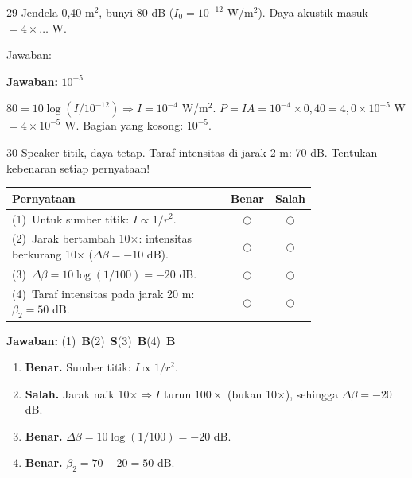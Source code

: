 \documentclass[11pt]{article}
\newcommand{\jawaban}[1]{%
  \noindent\colorbox{gold!30}{\parbox{\dimexpr\linewidth-2\fboxsep\relax}{%
    \textbf{Jawaban:} #1}}\par\smallskip}
\begin{document}
\begin{soal}{29}
Jendela 0{,}40 m$^2$, bunyi 80 dB ($I_0=10^{-12}$ W/m$^2$).
Daya akustik masuk $=4\times\ldots$ W.

\vspace{0.4em}\noindent Jawaban:\enspace\underline{\hspace{4cm}}
\end{soal}
\begin{pembox}
\jawaban{$10^{-5}$}
$80=10\log(I/10^{-12})\Rightarrow I=10^{-4}$ W/m$^2$.
$P=IA=10^{-4}\times0{,}40=4{,}0\times10^{-5}$ W $=4\times10^{-5}$ W.
Bagian yang kosong: $10^{-5}$.
\end{pembox}

\begin{soal}{30}
Speaker titik, daya tetap. Taraf intensitas di jarak 2 m: 70 dB.
Tentukan kebenaran setiap pernyataan!

\par\smallskip
{\renewcommand{\arraystretch}{1.4}%
\begin{tabular}{@{}p{0.76\linewidth}cc@{}}
\hline\textbf{Pernyataan}&\textbf{Benar}&\textbf{Salah}\\\hline
(1)~Untuk sumber titik: $I\propto1/r^2$.&$\bigcirc$&$\bigcirc$\\
(2)~Jarak bertambah 10$\times$: intensitas berkurang 10$\times$ ($\Delta\beta=-10$ dB).&$\bigcirc$&$\bigcirc$\\
(3)~$\Delta\beta=10\log(1/100)=-20$ dB.&$\bigcirc$&$\bigcirc$\\
(4)~Taraf intensitas pada jarak 20 m: $\beta_2=50$ dB.&$\bigcirc$&$\bigcirc$\\\hline
\end{tabular}}
\end{soal}
\begin{pembox}
\jawaban{(1)~\textbf{B}\quad(2)~\textbf{S}\quad(3)~\textbf{B}\quad(4)~\textbf{B}}
\begin{enumerate}[leftmargin=*,topsep=2pt,itemsep=2pt]
\item \textbf{Benar.} Sumber titik: $I\propto1/r^2$.
\item \textbf{Salah.} Jarak naik 10$\times\Rightarrow I$ turun $100\times$ (bukan 10$\times$), sehingga $\Delta\beta=-20$ dB.
\item \textbf{Benar.} $\Delta\beta=10\log(1/100)=-20$ dB.
\item \textbf{Benar.} $\beta_2=70-20=50$ dB.
\end{enumerate}
\end{pembox}
\end{document}
